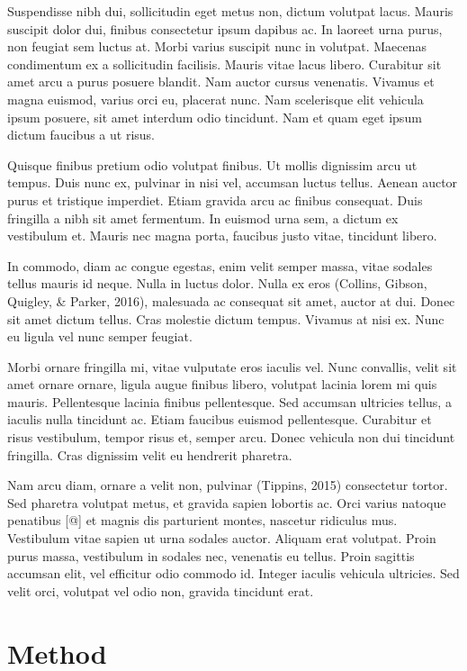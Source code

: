 \documentclass[english,,man]{apa6}
\begin{document}
Suspendisse nibh dui, sollicitudin eget metus non, dictum volutpat lacus. Mauris suscipit dolor dui, finibus consectetur ipsum dapibus ac. In laoreet urna purus, non feugiat sem luctus at. Morbi varius suscipit nunc in volutpat. Maecenas condimentum ex a sollicitudin facilisis. Mauris vitae lacus libero. Curabitur sit amet arcu a purus posuere blandit. Nam auctor cursus venenatis. Vivamus et magna euismod, varius orci eu, placerat nunc. Nam scelerisque elit vehicula ipsum posuere, sit amet interdum odio tincidunt. Nam et quam eget ipsum dictum faucibus a ut risus.

Quisque finibus pretium odio volutpat finibus. Ut mollis dignissim arcu ut tempus. Duis nunc ex, pulvinar in nisi vel, accumsan luctus tellus. Aenean auctor purus et tristique imperdiet. Etiam gravida arcu ac finibus consequat. Duis fringilla a nibh sit amet fermentum. In euismod urna sem, a dictum ex vestibulum et. Mauris nec magna porta, faucibus justo vitae, tincidunt libero.

In commodo, diam ac congue egestas, enim velit semper massa, vitae sodales tellus mauris id neque. Nulla in luctus dolor. Nulla ex eros (Collins, Gibson, Quigley, \& Parker, 2016), malesuada ac consequat sit amet, auctor at dui. Donec sit amet dictum tellus. Cras molestie dictum tempus. Vivamus at nisi ex. Nunc eu ligula vel nunc semper feugiat.

Morbi ornare fringilla mi, vitae vulputate eros iaculis vel. Nunc convallis, velit sit amet ornare ornare, ligula augue finibus libero, volutpat lacinia lorem mi quis mauris. Pellentesque lacinia finibus pellentesque. Sed accumsan ultricies tellus, a iaculis nulla tincidunt ac. Etiam faucibus euismod pellentesque. Curabitur et risus vestibulum, tempor risus et, semper arcu. Donec vehicula non dui tincidunt fringilla. Cras dignissim velit eu hendrerit pharetra.

Nam arcu diam, ornare a velit non, pulvinar (Tippins, 2015) consectetur tortor. Sed pharetra volutpat metus, et gravida sapien lobortis ac. Orci varius natoque penatibus {[}@{]} et magnis dis parturient montes, nascetur ridiculus mus. Vestibulum vitae sapien ut urna sodales auctor. Aliquam erat volutpat. Proin purus massa, vestibulum in sodales nec, venenatis eu tellus. Proin sagittis accumsan elit, vel efficitur odio commodo id. Integer iaculis vehicula ultricies. Sed velit orci, volutpat vel odio non, gravida tincidunt erat.

\hypertarget{method}{%
\section{Method}\label{method}}
\end{document}
